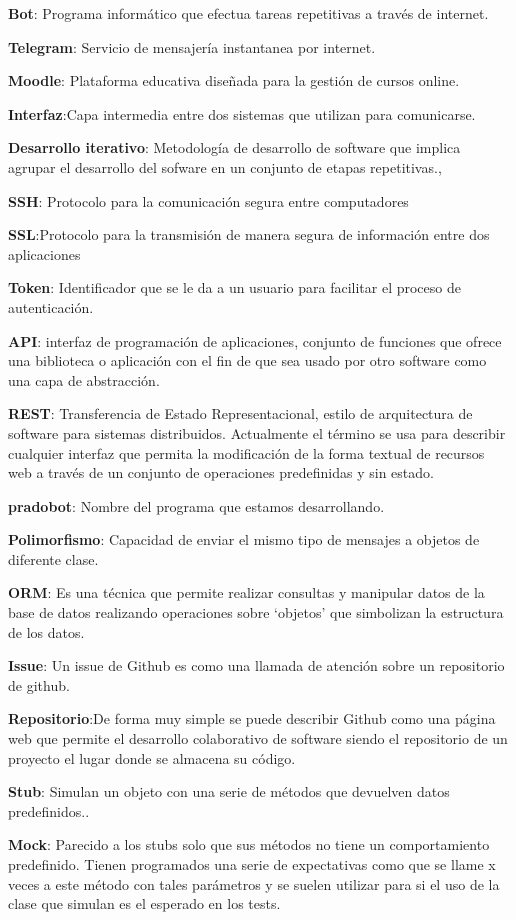 \documentclass[a4paper,11pt]{book}
\begin{document}
\textbf{Bot}: Programa informático que efectua tareas repetitivas a través de internet\cite{wikibot}\cite{wikibot2}.\par
\textbf{Telegram}: Servicio de mensajería instantanea por internet.\par
\textbf{Moodle}: Plataforma educativa diseñada para la gestión de cursos online.\par
\textbf{Interfaz}:Capa intermedia entre dos sistemas que utilizan para comunicarse.\par
\textbf{Desarrollo iterativo}: Metodología de desarrollo de software que implica agrupar el desarrollo del sofware en un conjunto de etapas repetitivas.\cite{wikiiterativo}, \cite{wikiiterativo2} \par
\textbf{SSH}: Protocolo para la comunicación segura entre computadores\cite{ssh}\par
\textbf{SSL}:Protocolo para la transmisión de manera segura de información entre dos aplicaciones\par
\textbf{Token}: Identificador que se le da a un usuario para facilitar el proceso de autenticación.\par
\textbf{API}:  interfaz de programación de aplicaciones, conjunto de funciones que ofrece una biblioteca o aplicación con el fin de que sea usado por otro software como una capa de abstracción.\par
\textbf{REST}:  Transferencia de Estado Representacional, estilo de arquitectura de software para sistemas distribuidos. Actualmente el término se usa para describir cualquier interfaz  que permita la modificación de la forma textual de recursos web a través de un conjunto de operaciones predefinidas y sin estado.\cite{rest1}\cite{rest2}\par
\textbf{pradobot}:  Nombre del programa que estamos desarrollando.\par
\textbf{Polimorfismo}: Capacidad de enviar el mismo tipo de mensajes a objetos de diferente clase. \par
\textbf{ORM}:  Es una técnica que permite realizar consultas y manipular datos de la base de datos realizando operaciones sobre  \enquote*{objetos} que simbolizan la estructura de los datos.\cite{orm1}\par
\textbf{Issue}:  Un issue de Github es como una llamada de atención sobre un repositorio de github.\par
\textbf{Repositorio}:De forma muy simple se puede describir Github como una página web que permite el desarrollo colaborativo de software siendo el repositorio de un proyecto el lugar donde se almacena su código.\par
\textbf{Stub}: Simulan un objeto con una serie de métodos que devuelven datos predefinidos..\cite{stub1}\par
\textbf{Mock}: Parecido a los stubs solo que sus métodos no tiene un comportamiento predefinido. Tienen programados una serie de expectativas como que se llame x veces a este método con tales parámetros y se suelen utilizar para si el uso de la clase que simulan es el esperado en los tests.\par
\end{document}
